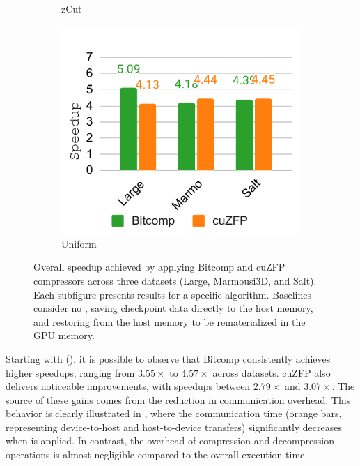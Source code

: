 \documentclass[Ingles,Final]{ic-tese-v3}
\begin{document}
\begin{figure}[h!]
\begin{subfigure}[b]{0.33\textwidth}
        \caption{zCut}
        \label{fig:compress_speedup_zcut}
    \end{subfigure}
    \hfill
    \begin{subfigure}[b]{0.32\textwidth}
        \includegraphics[width=\textwidth]{figures/compress_speedup/speedup_compress_uniform.pdf}
        \caption{Uniform}
        \label{fig:compress_speedup_uniform}
    \end{subfigure}
    
    \caption[Overall speedup (\compression)]{Overall speedup achieved by applying Bitcomp and cuZFP compressors across three datasets (Large, Marmousi3D, and Salt). Each subfigure presents results for a specific \checkpointing algorithm. Baselines consider no \compression, saving checkpoint data directly to the host memory, and restoring from the host memory to be rematerialized in the GPU memory.}
    
    \label{fig:compress_speedup}
\end{figure}

Starting with \revolve (), it is possible to observe that Bitcomp consistently achieves higher speedups, ranging from $3.55\times$ to $4.57\times$ across datasets. cuZFP also delivers noticeable improvements, with speedups between $2.79\times$ and $3.07\times$. The source of these gains comes from the reduction in communication overhead. This behavior is clearly illustrated in , where the communication time (orange bars, representing device-to-host and host-to-device transfers) significantly decreases when \compression is applied. In contrast, the overhead of compression and decompression operations is almost negligible compared to the overall execution time.
\end{document}
